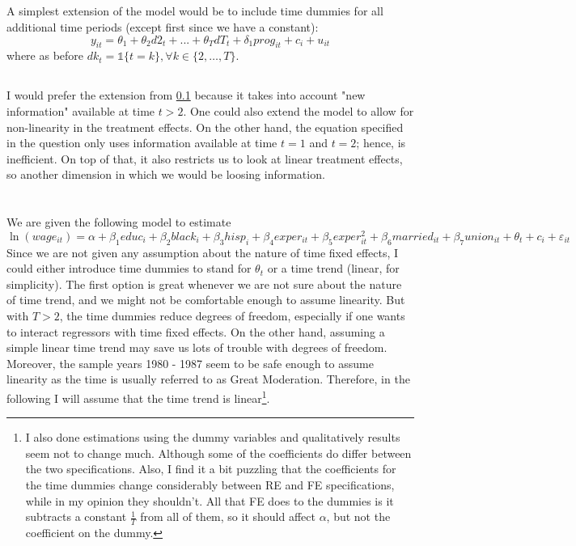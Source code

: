 \documentclass[]{article}
\begin{document}
\subsection{}
\label{subsec:1.4}
A simplest extension of the model would be to include time dummies for all additional time periods (except first since we have a constant):
\begin{equation}
	y_{it} = \theta_1 + \theta_2{d2}_t + ... + \theta_T{dT}_t + \delta_1{prog}_{it} + c_i + u_{it} \nonumber
\end{equation}
where as before ${dk}_t = \mathds{1}\{t = k\}, \forall k\in\{2, \ldots, T\}$.

\subsection{}
I would prefer the extension from \cref{subsec:1.4} because it takes into account "new information" available at time $t > 2$. One could also extend the model to allow for non-linearity in the treatment effects. On the other hand, the equation specified in the question only uses information available at time $t = 1$ and $t = 2$; hence, is inefficient. On top of that, it also restricts us to look at linear treatment effects, so another dimension in which we would be loosing information.

\section{}
\setcounter{subsection}{2}
We are given the following model to estimate
\begin{equation}
	\ln(wage_{it}) = \alpha + \beta_1 educ_i + \beta_2 black_i + \beta_3 hisp_i + \beta_4 exper_{it} + \beta_5 exper_{it}^2 + \beta_6 married_{it} + \beta_7 union_{it} + \theta_t + c_i + \varepsilon_{it} \nonumber
\end{equation}
Since we are not given any assumption about the nature of time fixed effects, I could either introduce time dummies to stand for $\theta_t$ or a time trend (linear, for simplicity). The first option is great whenever we are not sure about the nature of time trend, and we might not be comfortable enough to assume linearity. But with $T > 2$, the time dummies reduce degrees of freedom, especially if one wants to interact regressors with time fixed effects. On the other hand, assuming a simple linear time trend may save us lots of trouble with degrees of freedom. Moreover, the sample years 1980 - 1987 seem to be safe enough to assume linearity as the time is usually referred to as Great Moderation. Therefore, in the following I will assume that the time trend is linear\footnote{I also done estimations using the dummy variables and qualitatively results seem not to change much. Although some of the coefficients do differ between the two specifications. Also, I find it a bit puzzling that the coefficients for the time dummies change considerably between RE and FE specifications, while in my opinion they shouldn't. All that FE does to the dummies is it subtracts a constant $\frac{1}{T}$ from all of them, so it should affect $\alpha$, but not the coefficient on the dummy.}.
\end{document}
